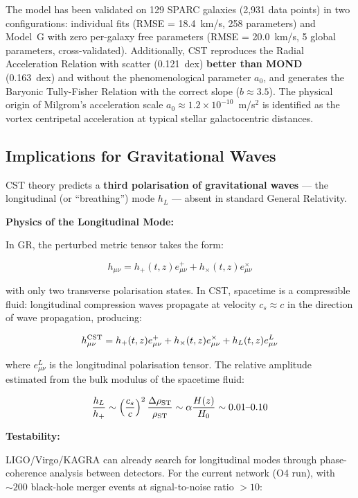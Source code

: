 \documentclass[10pt,a4paper]{article}
\begin{document}
The model has been validated on 129 SPARC galaxies (2{,}931 data points) in two configurations: individual fits (RMSE = 18.4~km/s, 258 parameters) and Model~G with zero per-galaxy free parameters (RMSE = 20.0~km/s, 5 global parameters, cross-validated). Additionally, CST reproduces the Radial Acceleration Relation with scatter (0.121~dex) \textbf{better than MOND} (0.163~dex) and without the phenomenological parameter $a_0$, and generates the Baryonic Tully-Fisher Relation with the correct slope ($b \approx 3.5$). The physical origin of Milgrom's acceleration scale $a_0 \approx 1.2 \times 10^{-10}$~m/s$^2$ is identified as the vortex centripetal acceleration at typical stellar galactocentric distances.

\subsection{Implications for Gravitational
Waves}\label{implications-for-gravitational-waves}

CST theory predicts a \textbf{third polarisation of gravitational waves}
--- the longitudinal (or ``breathing'') mode \(h_L\) --- absent in
standard General Relativity.

\textbf{Physics of the Longitudinal Mode:}

In GR, the perturbed metric tensor takes the form:

\[h_{\mu\nu} = h_+(t,z) e^+_{\mu\nu} + h_\times(t,z) e^\times_{\mu\nu}\]

with only two transverse polarisation states. In CST, spacetime is a
compressible fluid: longitudinal compression waves propagate at velocity
\(c_s \approx c\) in the direction of wave propagation, producing:

\[h_{\mu\nu}^{\rm CST} = h_+(t,z) e^+_{\mu\nu} + h_\times(t,z) e^\times_{\mu\nu} + h_L(t,z) e^L_{\mu\nu}\]

where \(e^L_{\mu\nu}\) is the longitudinal polarisation tensor. The
relative amplitude estimated from the bulk modulus of the spacetime
fluid:

\[\frac{h_L}{h_+} \sim \left(\frac{c_s}{c}\right)^2 \frac{\Delta\rho_{\rm ST}}{\rho_{\rm ST}} \sim \alpha \frac{H(z)}{H_0} \sim 0.01\text{--}0.10\]

\textbf{Testability:}

LIGO/Virgo/KAGRA can already search for longitudinal modes through
phase-coherence analysis between detectors. For the current network (O4
run), with \(\sim 200\) black-hole merger events at signal-to-noise
ratio \(> 10\):
\end{document}
